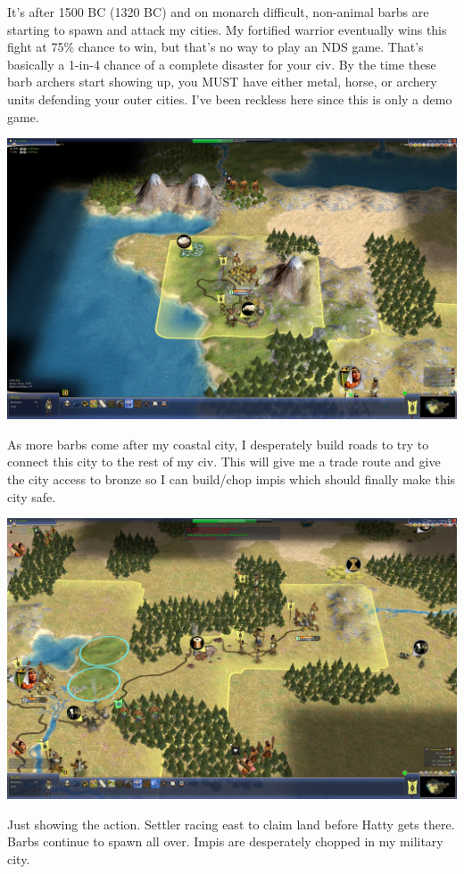 \documentclass[10pt]{article}
\begin{document}
It's after 1500 BC (1320 BC) and on monarch difficult, non-animal
barbs are starting to spawn and attack my cities. My fortified warrior
eventually wins this fight at 75\% chance to win, but that's no way to
play an NDS game. That's basically a 1-in-4 chance of a complete
disaster for your civ. By the time these barb archers start showing
up, you MUST have either metal, horse, or archery units defending your
outer cities. I've been reckless here since this is only a demo game.

\includegraphics[width=1.0\textwidth]{36}

As more barbs come after my coastal city, I desperately build roads to try to connect this city to the
rest of my civ. This will give me a trade route and give the city access to bronze so I can build/chop
impis which should finally make this city safe.

\includegraphics[width=1.0\textwidth]{37}

Just showing the action. Settler racing east to claim land before Hatty gets there. Barbs continue to spawn
all over. Impis are desperately chopped in my military city.
\end{document}

